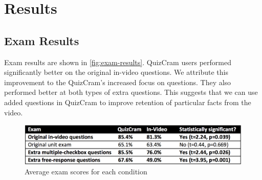 \documentclass{chi-ext}
\begin{document}
\section{Results}

\subsection{Exam Results}

Exam results are shown in \autoref{fig:exam-results}.  QuizCram users performed significantly better on the original in-video questions. We attribute this improvement to the QuizCram's increased focus on questions. They also performed better at both types of extra questions. This suggests that we can use added questions in QuizCram to improve retention of particular facts from the video.

\begin{figure}
\centering
\includegraphics[width=1.0\columnwidth]{exam-results}
\caption{Average exam scores for each condition}
\label{fig:exam-results}
\end{figure}




\end{document}
